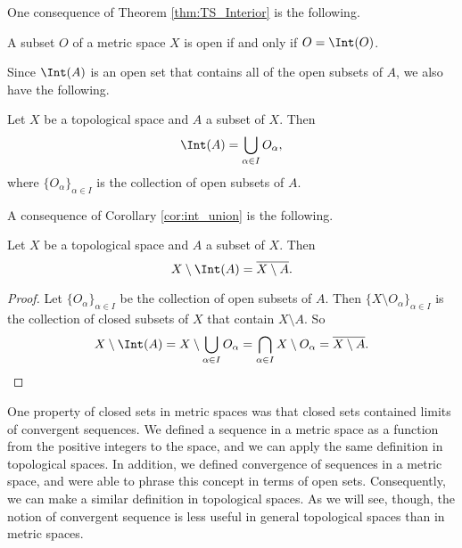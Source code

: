 One consequence of Theorem \ref{thm:TS_Interior} is the following.



\begin{corollary} A subset $O$ of a metric space $X$ is open if and only if $O = \Int(O)$. 
\end{corollary}
 


Since $\Int(A)$ is an open set that contains all of the open subsets of $A$, we also have the following.



\begin{corollary} \label{cor:int_union} Let $X$ be a topological space and $A$ a subset of $X$. Then 
\[\Int(A) = \bigcup_{\alpha \in I} O_{\alpha},\]
where $\{O_{\alpha}\}_{\alpha \in I}$ is the collection of open subsets of $A$. 
\end{corollary}



A consequence of Corollary \ref{cor:int_union} is the following.



\begin{corollary} Let $X$ be a topological space and $A$ a subset of $X$. Then
\[X \setminus \Int(A) = \overline{X \setminus A}.\]
\end{corollary}

\begin{proof} Let $\{O_{\alpha}\}_{\alpha \in I}$ be the collection of open subsets of $A$. Then $\{X \setminus O_{\alpha}\}_{\alpha \in I}$ is the collection of closed subsets of $X$ that contain $X \setminus A$. So
\[X \setminus \Int(A) = X \setminus \bigcup_{\alpha \in I} O_{\alpha} = \bigcap_{\alpha \in I} X \setminus O_{\alpha} = \overline{X \setminus A}.\]
\end{proof}   




\label{sec_seq_top_spaces}

One property of closed sets in metric spaces was that closed sets contained limits of convergent sequences. We defined a sequence in a metric space as a function from the positive integers to the space, and we can apply the same definition in topological spaces. In addition, we defined convergence of sequences in a metric space, and were able to phrase this concept in terms of open sets. Consequently, we can make a similar definition in topological spaces. As we will see, though, the notion of convergent sequence is less useful in general topological spaces than in metric spaces. 



